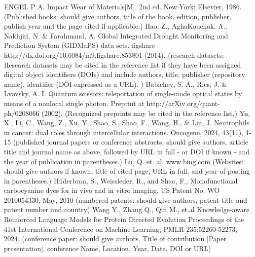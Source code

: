 \clearpage

\renewcommand{\bibname}{\xiaoyi\bf\vspace{5pt} References}

\begin{thebibliography}{99}
    \setlength{\itemindent}{-5pt}
     ENGEL P A.  Impact Wear of Materials[M]. 2nd ed. New York: Elsevier, 1986. (Published books: should give authors, title of the book, edition, publisher, publish year and the page cited if applicable.)
    	Hao, Z., AghaKouchak, A., Nakhjiri, N. \& Farahmand, A. Global Integrated Drought Monitoring and Prediction System (GIDMaPS) data sets. figshare http://dx.doi.org/10.6084/m9.figshare.853801 (2014). (research datasets: Research datasets may be cited in the reference list if they have been assigned digital object identifiers (DOIs) and include authors, title, publisher (repository name), identifier (DOI expressed as a URL). )
    	Babichev, S. A., Ries, J. \& Lvovsky, A. I. Quantum scissors: teleportation of single-mode optical states by means of a nonlocal single photon. Preprint at http://arXiv.org/quant-ph/0208066 (2002). (Recognized preprints may be cited in the reference list.)
    	Yu, X., Li, C., Wang, Z., Xu, Y., Shao, S., Shao, F., Wang, H., \& Liu, J. Neutrophils in cancer: dual roles through intercellular interactions. Oncogene, 2024, 43(11), 1-15 (published journal papers or conference abstracts: should give authors, article title and journal name as above, followed by URL in full - or DOI if known - and the year of publication in parentheses.)
    	Lu, Q. et. al. www.bing.com (Websites: should give authors if known, title of cited page, URL in full, and year of posting in parentheses.)
    	Hilderbran, S., Weissleder, R., and Shao, F., Monofunctional carbocyanine dyes for in vivo and in vitro imaging, US Patent No. WO 2010054330, May, 2010 (numbered patents: should give authors, patent title and patent number and country)
     Wang Y., Zhang Q., Qin M., et.al Knowledge-aware Reinforced Language Models for Protein Directed Evolution Proceedings of the 41st International Conference on Machine Learning, PMLR 235:52260-52273, 2024. (conference paper: should give authors, Title of contribution [Paper presentation]. conference Name, Location, Year, Date. DOI or URL)
\end{thebibliography}
\doublespacing